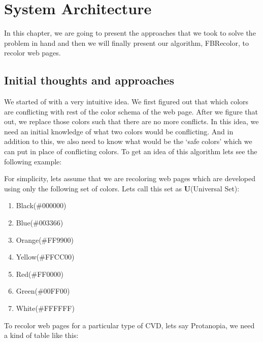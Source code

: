 \chapter{System Architecture}
\thispagestyle{plain}


\label{System Architecture}
In this chapter, we are going to present the approaches that we took to solve the problem in hand and then we will finally present our algorithm, FBRecolor,  to recolor web pages.

\section{Initial thoughts and approaches}
\label{Initial approaches}
We started of with a very intuitive idea. We first figured out that which colors are conflicting with rest of the color schema of the web page. After we figure that out, we replace those colors such that there are no more conflicts. In this idea, we need an initial knowledge of what two colors would be conflicting. And in addition to this, we also need to know what would be the ‘safe colors’ which we can put in place of conflicting colors. To get an idea of this algorithm lets see the following example:

For simplicity, lets assume that we are recoloring web pages which are developed using only the following set of colors. Lets call this set as \textbf{U}(Universal Set):
\begin{enumerate}
    \item Black(\#000000)
    \item Blue(\#003366)
    \item Orange(\#FF9900)
    \item Yellow(\#FFCC00)
    \item Red(\#FF0000)
    \item Green(\#00FF00)
    \item White(\#FFFFFF)
\end{enumerate}

To recolor web pages for a particular type of CVD, lets say Protanopia, we need a kind of table like this:

